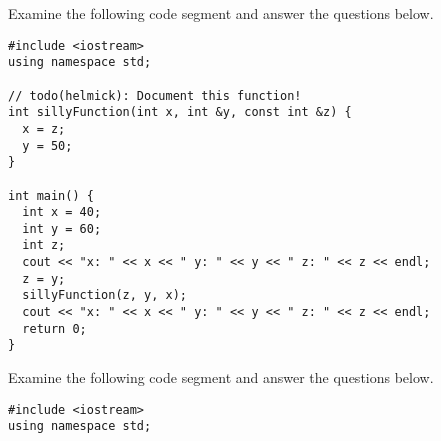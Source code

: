 \documentclass[11pt,answers]{exam}
\begin{document}
\begin{questions}
\question Examine the following code segment and answer the questions below.
\begin{lstlisting}
#include <iostream>
using namespace std;

// todo(helmick): Document this function!
int sillyFunction(int x, int &y, const int &z) {
  x = z;
  y = 50;
}

int main() {
  int x = 40;
  int y = 60;
  int z;
  cout << "x: " << x << " y: " << y << " z: " << z << endl;
  z = y;
  sillyFunction(z, y, x);
  cout << "x: " << x << " y: " << y << " z: " << z << endl;
  return 0;
}
\end{lstlisting}


\newpage
\question Examine the following code segment and answer the questions below.
\begin{parts}
\begin{lstlisting}
#include <iostream>
using namespace std;


\end{lstlisting}
\end{parts}
\end{questions}
\end{document}
